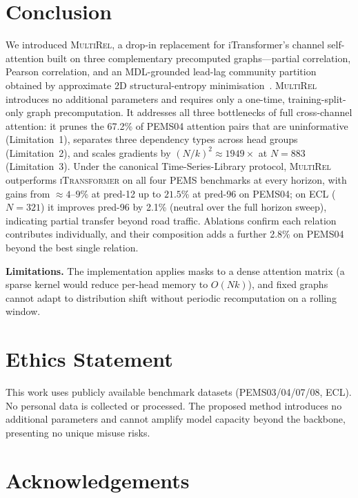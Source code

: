 \documentclass[letterpaper]{article}   %
\newcommand{\mr}{\textsc{MultiRel}}
\newcommand{\itrans}{\textsc{iTransformer}}
\begin{document}
\section{Conclusion}
\label{sec:conclusion}

We introduced \mr{}, a drop-in replacement for iTransformer's channel
self-attention built on three complementary precomputed graphs---partial
correlation, Pearson correlation, and an MDL-grounded lead-lag community partition
obtained by approximate 2D structural-entropy minimisation~\cite{li2016structural}.
\mr{} introduces no additional parameters and requires only a one-time, training-split-only
graph precomputation.
It addresses all three bottlenecks of full cross-channel attention:
it prunes the 67.2\% of PEMS04 attention pairs that are uninformative (Limitation~1),
separates three dependency types across head groups (Limitation~2), and scales gradients
by $(N/k)^2{\approx}1949\times$ at $N{=}883$ (Limitation~3).
Under the canonical Time-Series-Library protocol, \mr{} outperforms \itrans{} on
all four PEMS benchmarks at every horizon, with gains from ${\approx}4$--$9$\% at
pred-12 up to $21.5$\% at pred-96 on PEMS04; on ECL ($N{=}321$) it improves
pred-96 by 2.1\% (neutral over the full horizon sweep), indicating partial transfer beyond road traffic.
Ablations confirm each relation contributes individually, and their composition
adds a further 2.8\% on PEMS04 beyond the best single relation.

\textbf{Limitations.}
The implementation applies masks to a dense attention matrix (a sparse kernel
would reduce per-head memory to $O(Nk)$), and fixed graphs cannot adapt to
distribution shift without periodic recomputation on a rolling window.

\section*{Ethics Statement}

This work uses publicly available benchmark datasets (PEMS03/04/07/08, ECL).
No personal data is collected or processed.
The proposed method introduces no additional parameters and cannot amplify
model capacity beyond the backbone, presenting no unique misuse risks.

\section*{Acknowledgements}
\end{document}
